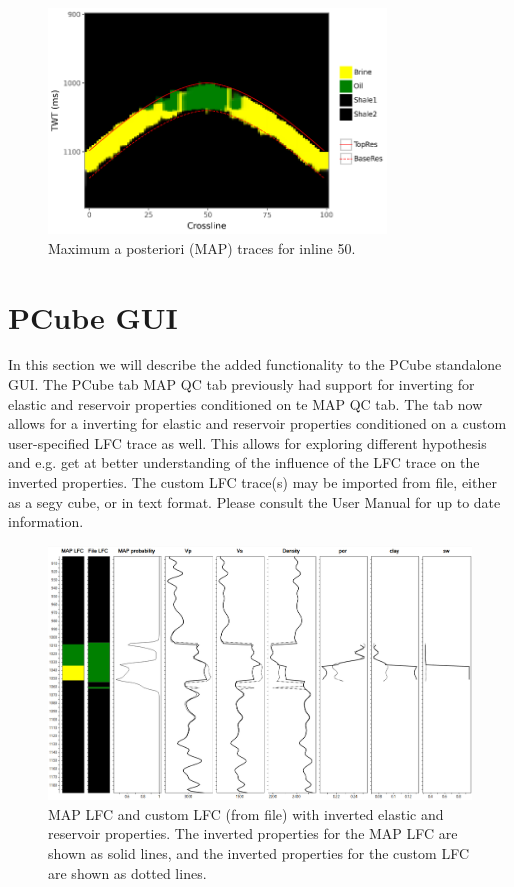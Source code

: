 \documentclass[note,screen,english,12pt,utf8]{nrdoc}
\begin{document}
\begin{figure}[h]
    \centering
    \includegraphics[width=0.8\textwidth]{figures/map_traces.png}
    \caption{Maximum a posteriori (MAP) traces for inline 50.}
    \label{fig:map_traces}
\end{figure}


\section{PCube GUI}

In this section we will describe the added functionality to the PCube standalone GUI.
The PCube tab MAP QC tab previously had support for inverting for elastic and reservoir
properties conditioned on te MAP QC tab. The tab now allows for a inverting for elastic
and reservoir properties conditioned on a custom user-specified LFC trace as well.
This allows for exploring different hypothesis and e.g. get at better understanding of the influence of the
LFC trace on the inverted properties. The custom LFC trace(s) may be imported from file,
either as a segy cube, or in text format. Please consult the User Manual for up to date
information.

\begin{figure}[h]
    \centering
    \includegraphics[width=\textwidth]{figures/gui_property_inversion_tab_il57_xl62_file.png}
    \caption{MAP LFC and custom LFC (from file) with inverted elastic and reservoir properties.
    The inverted properties for the MAP LFC are shown as solid lines, and
    the inverted properties for the custom LFC are shown as dotted lines.
    }
    \label{fig:custom_lfc_property_inversion_tab}
\end{figure}
\end{document}
